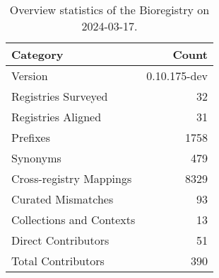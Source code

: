 \begin{table}
\caption{Overview statistics of the Bioregistry on 2024-03-17.}
\label{tab:bioregistry-summary}
\begin{tabular}{lr}
\toprule
Category & Count \\
\midrule
Version & 0.10.175-dev \\
Registries Surveyed & 32 \\
Registries Aligned & 31 \\
Prefixes & 1758 \\
Synonyms & 479 \\
Cross-registry Mappings & 8329 \\
Curated Mismatches & 93 \\
Collections and Contexts & 13 \\
Direct Contributors & 51 \\
Total Contributors & 390 \\
\bottomrule
\end{tabular}
\end{table}
